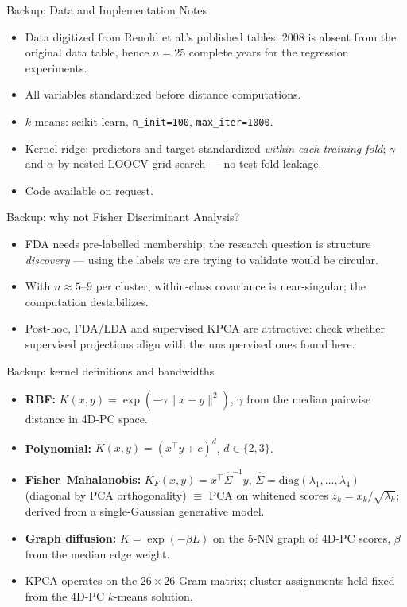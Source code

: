 \documentclass[10pt,aspectratio=169]{beamer}
\newcommand{\pc}[1]{PC#1}
\newcommand{\kmeans}{$k$-means}
\newcommand{\kpca}{KPCA}
\begin{document}
\begin{frame}{Backup: Data and Implementation Notes}
  \begin{itemize}
    \item Data digitized from Renold et al.'s published tables; 2008 is absent
      from the original data table, hence $n=25$ complete years for the
      regression experiments.
    \item All variables standardized before distance computations.
    \item \kmeans{}: scikit-learn, \texttt{n\_init=100},
      \texttt{max\_iter=1000}.
    \item Kernel ridge: predictors and target standardized \emph{within each
      training fold}; $\gamma$ and $\alpha$ by nested LOOCV grid search ---
      no test-fold leakage.
    \item Code available on request.
  \end{itemize}
\end{frame}



\begin{frame}{Backup: why not Fisher Discriminant Analysis?}
  \begin{itemize}
    \item FDA needs pre-labelled membership; the research question is
      structure \emph{discovery} --- using the labels we are trying to
      validate would be circular.
    \item With $n \approx 5$--$9$ per cluster, within-class covariance is
      near-singular; the computation destabilizes.
    \item Post-hoc, FDA/LDA and supervised \kpca{} are attractive: check
      whether supervised projections align with the unsupervised ones found
      here.
  \end{itemize}
\end{frame}



\begin{frame}{Backup: kernel definitions and bandwidths}
  \begin{itemize}
    \item \textbf{RBF:} $K(x,y)=\exp(-\gamma\|x-y\|^2)$,
      $\gamma$ from the median pairwise distance in 4D-\pc{} space.
    \item \textbf{Polynomial:} $K(x,y)=(x^{\top}y + c)^d$, $d \in \{2,3\}$.
    \item \textbf{Fisher--Mahalanobis:} $K_F(x,y)=x^{\top}\hat\Sigma^{-1}y$,
      $\hat\Sigma=\mathrm{diag}(\lambda_1,\dots,\lambda_4)$ (diagonal by PCA
      orthogonality) $\equiv$ PCA on whitened scores
      $z_k = x_k/\sqrt{\lambda_k}$; derived from a single-Gaussian generative
      model.
    \item \textbf{Graph diffusion:} $K=\exp(-\beta L)$ on the 5-NN graph of
      4D-\pc{} scores, $\beta$ from the median edge weight.
    \item \kpca{} operates on the $26\times26$ Gram matrix; cluster
      assignments held fixed from the 4D-\pc{} \kmeans{} solution.
  \end{itemize}
\end{frame}
\end{document}
